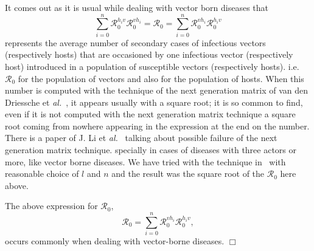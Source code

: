 \documentclass[a4paper]{article}
\newcommand{\edem}{\hfill $\Box$ }
\newcommand{\dsum}{\displaystyle\sum}
\newcommand{\varpiVar}{r_{suc}}
\begin{document}
{%
 It comes out as it is usual while dealing with vector born diseases that $${\dsum_{i=0}^n}\mathcal R_0^{h_iv}\mathcal R_0^{vh_i}=\mathcal R_0={\dsum_{i=0}^n}\mathcal R_0^{vh_i}\mathcal R_0^{h_iv}$$ represents the average number of secondary cases of infectious vectors (respectively hosts) that are occasioned by one infectious vector (respectively host) introduced in a population of susceptible vectors (respectively hosts). i.e. $\mathcal R_0$ for the population of vectors and also for the population of hosts. When this number is computed with the technique of the next generation matrix of van den Driessche et {\it al.}~\cite{VddWat02}, it appears usually with a square root; it is so common to find, even if it is not computed with the next generation matrix technique a square root coming from nowhere appearing in the expression at the end on the number. There is a paper of J. Li et {\it al.}~\cite{527610} talking about possible failure of the next generation matrix technique. specially in cases of diseases with three actors or more, like vector borne diseases.  We have tried with the technique in~\cite{VddWat02} with reasonable choice of $l$ and $n$ and the  result was the square root of the $\mathcal R_0$ here above.

The above expression for $\mathcal R_0$, 
$$\mathcal R_0={\dsum_{i=0}^n}\mathcal R_0^{vh_i}\mathcal R_0^{h_iv},$$
occurs commonly when dealing with vector-borne diseases. 
 \edem




}
\end{document}
